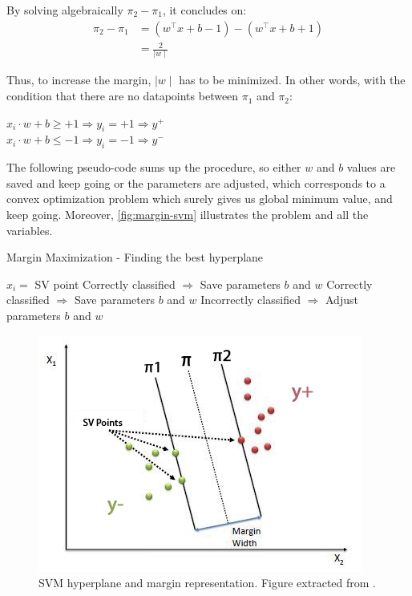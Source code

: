 \documentclass[11pt, openany]{report}
\theoremstyle{plain}
\theoremstyle{definition}
\theoremstyle{remark}
\begin{document}
By solving algebraically $\pi_{2}-\pi_{1}$, it concludes on:
\begin{align}
\pi_{2}-\pi_{1} &= (w^\top x + b - 1) - (w^\top x + b + 1)\nonumber  \\ 
 				&= \frac{2}{\mid w \mid} \nonumber
\end{align} 

Thus, to increase the margin, $\mid w \mid$ has to be minimized. In other words, with the condition that there are no datapoints between $\pi_{1}$ and $\pi_{2}$:
\begin{center}
$ x_{i} \cdot w + b \geq +1 \Rightarrow y_{i} = +1 \Rightarrow y^{+} $ \\
$ x_{i} \cdot w + b \leq -1 \Rightarrow y_{i} = -1 \Rightarrow y^{-} $
\end{center}

The following pseudo-code sums up the procedure, so either $w$ and $b$ values are saved and keep going or the parameters are adjusted, which corresponds to a convex optimization problem which surely gives us global minimum value, and keep going. Moreover, \autoref{fig:margin-svm} illustrates the problem and all the variables. 
 
\begin{algorithm} 
  \caption{Margin Maximization - Finding the best hyperplane} \label{alg:max-margin}
  \begin{algorithmic}[1]
  \State $x_{i} =$ SV point
  \State Correctly classified $\Rightarrow$ Save parameters $b$ and $w$ 
  \State Correctly classified $\Rightarrow$ Save parameters $b$ and $w$
  \Else 
  \State Incorrectly classified $\Rightarrow$ Adjust parameters $b$ and $w$
  \EndIf 
  \EndFor
  \end{algorithmic}
\end{algorithm}




\begin{figure}[h]
  \centering
  \includegraphics[scale=0.85]{figures/margin-svm.png}
  \caption{SVM hyperplane and margin representation. Figure extracted from \cite{svm-towardsdatascience}.}
  \label{fig:margin-svm}
\end{figure}
\end{document}
